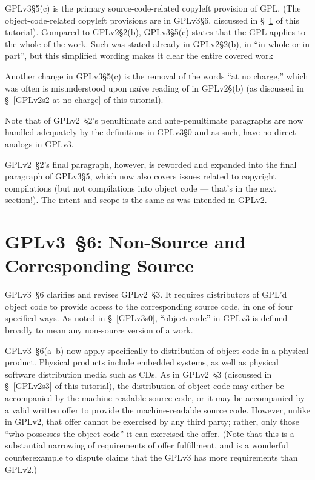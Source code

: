 GPLv3\S5(c) is the primary source-code-related copyleft provision of GPL. (The
object-code-related copyleft provisions are in GPLv3\S6, discussed in
\S~\ref{GPLv3s6} of this tutorial).  Compared to GPLv2\S2(b), GPLv3\S5(c)
states that the GPL applies to the whole of the work.  Such was stated
already in GPLv2\S2(b), in ``in whole or in part'', but this simplified
wording makes it clear the entire covered work

Another change in GPLv3\S5(c) is the removal of the
words ``at no charge,'' which was often is misunderstood upon na\"{i}ve
reading of in GPLv2\S(b) (as discussed in \S~\ref{GPLv2s2-at-no-charge} of this
tutorial).



Note that of GPLv2~\S2's penultimate and ante-penultimate paragraphs are now
handled adequately by the definitions in GPLv3\S0 and as such, have no direct
analogs in GPLv3.

GPLv2~\S2's final paragraph, however, is reworded and expanded into the final
paragraph of GPLv3\S5, which now also covers issues related to copyright
compilations (but not compilations into object code --- that's in the next
section!).  The intent and scope is the same as was intended in GPLv2.

\section{GPLv3~\S6: Non-Source and Corresponding Source}
\label{GPLv3s6}

GPLv3~\S6 clarifies and revises GPLv2~\S3.  It requires distributors of GPL'd
object code to provide access to the corresponding source code, in one of
four specified ways.  As noted in \S~\ref{GPLv3s0}, ``object code'' in GPLv3
is defined broadly to mean any non-source version of a work.


GPLv3~\S6(a--b) now apply specifically to distribution of object code in a
physical product.  Physical products include embedded systems, as well as
physical software distribution media such as CDs.  As in GPLv2~\S3 (discussed
in \S~\ref{GPLv2s3} of this tutorial), the distribution of object code may
either be accompanied by the machine-readable source code, or it may be
accompanied by a valid written offer to provide the machine-readable source
code.  However, unlike in GPLv2, that offer cannot be exercised by any third
party; rather, only those ``who possesses the object code'' it can exercised
the offer.  (Note that this is a substantial narrowing of requirements of
offer fulfillment, and is a wonderful counterexample to dispute claims that
the GPLv3 has more requirements than GPLv2.)

